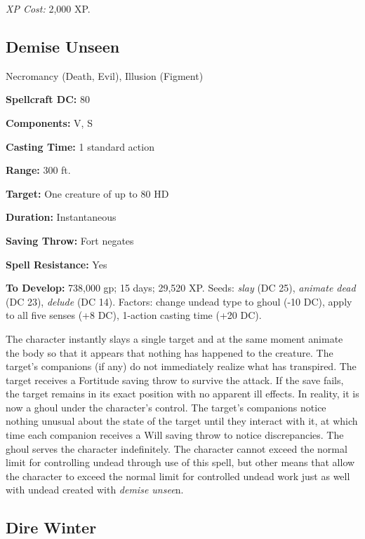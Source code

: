 \documentclass{article}
\begin{document}
\textit{XP Cost: }2,000 XP. 

\vspace{12pt}
\subsection*{Demise Unseen }

Necromancy (Death, Evil), Illusion (Figment) 

\textbf{Spellcraft DC:} 80 

\textbf{Components:} V, S 

\textbf{Casting Time:} 1 standard action 

\textbf{Range:} 300 ft. 

\textbf{Target:} One creature of up to 80 HD 

\textbf{Duration:} Instantaneous 

\textbf{Saving Throw:} Fort negates 

\textbf{Spell Resistance:} Yes 

\textbf{To Develop:} 738,000 gp; 15 days; 29,520 XP. Seeds: \textit{slay }(DC 25), 
\textit{animate dead }(DC 23), \textit{delude }(DC 14). Factors: change undead 
type to ghoul (-10 DC), apply to all five senses (+8 DC), 1-action casting time 
(+20 DC). 

The character instantly slays a single target and at the same moment animate the 
body so that it appears that nothing has happened to the creature. The target's 
companions (if any) do not immediately realize what has transpired. The target 
receives a Fortitude saving throw to survive the attack. If the save fails, the 
target remains in its exact position with no apparent ill effects. In reality, 
it is now a ghoul under the character's control. The target's companions notice 
nothing unusual about the state of the target until they interact with it, at which 
time each companion receives a Will saving throw to notice discrepancies. The ghoul 
serves the character indefinitely. The character cannot exceed the normal limit 
for controlling undead through use of this spell, but other means that allow the 
character to exceed the normal limit for controlled undead work just as well with 
undead created with \textit{demise unsee}n. 

\vspace{12pt}
\subsection*{Dire Winter }
\end{document}
